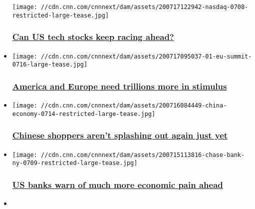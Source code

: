 \begin{itemize}
  \texttt{[image: //cdn.cnn.com/cnnnext/dam/assets/200717122942-nasdaq-0708-restricted-large-tease.jpg]}

  \hypertarget{can-us-tech-stocks-keep-racing-ahead}{%
  \subsubsection{\texorpdfstring{\href{/2020/07/19/investing/stocks-week-ahead/index.html}{Can
  US tech stocks keep racing
  ahead?}}{Can US tech stocks keep racing ahead?}}\label{can-us-tech-stocks-keep-racing-ahead}}
\item
  \href{/2020/07/17/investing/premarket-stocks-trading/index.html}{}

  \texttt{[image: //cdn.cnn.com/cnnnext/dam/assets/200717095037-01-eu-summit-0716-large-tease.jpg]}

  \hypertarget{america-and-europe-need-trillions-more-in-stimulus}{%
  \subsubsection{\texorpdfstring{\href{/2020/07/17/investing/premarket-stocks-trading/index.html}{America
  and Europe need trillions more in
  stimulus}}{America and Europe need trillions more in stimulus}}\label{america-and-europe-need-trillions-more-in-stimulus}}
\item
  \href{/2020/07/16/investing/premarket-stocks-trading/index.html}{}

  \texttt{[image: //cdn.cnn.com/cnnnext/dam/assets/200716084449-china-economy-0714-restricted-large-tease.jpg]}

  \hypertarget{chinese-shoppers-arent-splashing-out-again-just-yet}{%
  \subsubsection{\texorpdfstring{\href{/2020/07/16/investing/premarket-stocks-trading/index.html}{Chinese
  shoppers aren't splashing out again just
  yet}}{Chinese shoppers aren't splashing out again just yet}}\label{chinese-shoppers-arent-splashing-out-again-just-yet}}
\item
  \href{/2020/07/15/investing/premarket-stocks-trading/index.html}{}

  \texttt{[image: //cdn.cnn.com/cnnnext/dam/assets/200715113816-chase-bank-ny-0709-restricted-large-tease.jpg]}

  \hypertarget{us-banks-warn-of-much-more-economic-pain-ahead}{%
  \subsubsection{\texorpdfstring{\href{/2020/07/15/investing/premarket-stocks-trading/index.html}{US
  banks warn of much more economic pain
  ahead}}{US banks warn of much more economic pain ahead}}\label{us-banks-warn-of-much-more-economic-pain-ahead}}
\item
\end{itemize}

